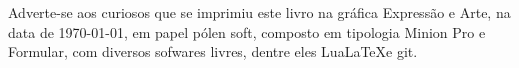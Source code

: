 \pagebreak

\ifodd\thepage\blankpage\fi

\parindent=0pt
\footnotesize\thispagestyle{empty}









\mbox{}\vfill
\begin{center}
		\begin{minipage}{.7\textwidth}\tiny\noindent{}
		\centering\tiny
		Adverte-se aos curiosos que se imprimiu este 
		livro na gráfica Expressão e Arte, 
		na data de \today, em papel pólen soft, composto em tipologia Minion Pro e Formular, 
		com diversos sofwares livres, 
		dentre eles Lua\LaTeX e git.\\ 
		\medskip\\\
		\end{minipage}
\end{center}